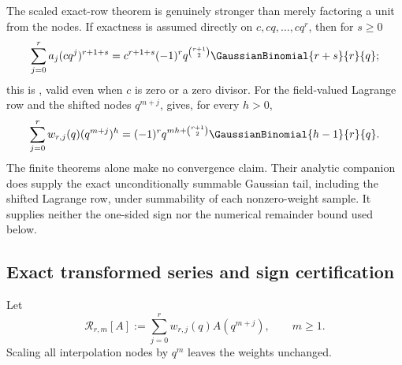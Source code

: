 \documentclass[11pt,oneside]{article}
\numberwithin{equation}{section}
\theoremstyle{definition}
\theoremstyle{remark}
\begin{document}
The scaled exact-row theorem is genuinely stronger than merely factoring a
unit from the nodes.  If exactness is assumed directly on
\(c,cq,\ldots,cq^r\), then for \(s\ge0\)
\[
 \sum_{j=0}^{r}a_j(cq^j)^{r+1+s}
 =c^{r+1+s}(-1)^r q^{\binom{r+1}{2}}
   \GaussianBinomial{r+s}{r}{q};
\]
this is , valid even when
\(c\) is zero or a zero divisor.  For the field-valued Lagrange row and the
shifted nodes \(q^{m+j}\),
 gives, for every
\(h>0\),
\[
 \sum_{j=0}^{r}w_{r,j}(q)(q^{m+j})^h
 =(-1)^r q^{mh+\binom{r+1}{2}}\GaussianBinomial{h-1}{r}{q}.
\]
The finite theorems alone make no convergence claim.  Their analytic companion
 does supply the exact unconditionally summable
Gaussian tail, including the shifted Lagrange row, under summability of each
nonzero-weight sample.  It supplies neither the one-sided sign nor the numerical
remainder bound used below.

\subsection{Exact transformed series and sign certification}

Let
\begin{equation}
 \mathcal R_{r,m}[A]
 :=\sum_{j=0}^{r}w_{r,j}(q)A(q^{m+j}),
 \qquad m\ge1.
 \label{p1:eq:Rrm-def}
\end{equation}
Scaling all interpolation nodes by $q^m$ leaves the weights unchanged.
\end{document}
